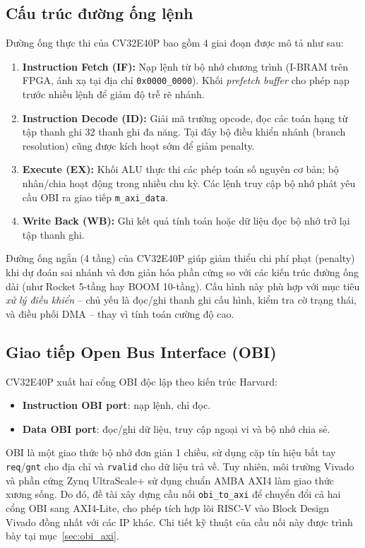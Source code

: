\subsection{Cấu trúc đường ống lệnh}
Đường ống thực thi của CV32E40P bao gồm 4 giai đoạn được mô tả như sau:
\begin{enumerate}
    \item \textbf{Instruction Fetch (IF):} Nạp lệnh từ bộ nhớ chương trình (I-BRAM trên FPGA, ánh xạ tại địa chỉ \texttt{0x0000\_0000}). Khối \textit{prefetch buffer} cho phép nạp trước nhiều lệnh để giảm độ trễ rẽ nhánh.
    \item \textbf{Instruction Decode (ID):} Giải mã trường opcode, đọc các toán hạng từ tập thanh ghi 32 thanh ghi đa năng. Tại đây bộ điều khiển nhánh (branch resolution) cũng được kích hoạt sớm để giảm penalty.
    \item \textbf{Execute (EX):} Khối ALU thực thi các phép toán số nguyên cơ bản; bộ nhân/chia hoạt động trong nhiều chu kỳ. Các lệnh truy cập bộ nhớ phát yêu cầu OBI ra giao tiếp \texttt{m\_axi\_data}.
    \item \textbf{Write Back (WB):} Ghi kết quả tính toán hoặc dữ liệu đọc bộ nhớ trở lại tập thanh ghi.
\end{enumerate}

Đường ống ngắn (4 tầng) của CV32E40P giúp giảm thiểu chi phí phạt (penalty) khi dự đoán sai nhánh và đơn giản hóa phần cứng so với các kiến trúc đường ống dài (như Rocket 5-tầng hay BOOM 10-tầng). Cấu hình này phù hợp với mục tiêu \textit{xử lý điều khiển} -- chủ yếu là đọc/ghi thanh ghi cấu hình, kiểm tra cờ trạng thái, và điều phối DMA -- thay vì tính toán cường độ cao.

\subsection{Giao tiếp Open Bus Interface (OBI)}
\label{sec:obi}
CV32E40P xuất hai cổng OBI độc lập theo kiến trúc Harvard:
\begin{itemize}
    \item \textbf{Instruction OBI port}: nạp lệnh, chỉ đọc.
    \item \textbf{Data OBI port}: đọc/ghi dữ liệu, truy cập ngoại vi và bộ nhớ chia sẻ.
\end{itemize}

OBI là một giao thức bộ nhớ đơn giản 1 chiều, sử dụng cặp tín hiệu bắt tay \texttt{req}/\texttt{gnt} cho địa chỉ và \texttt{rvalid} cho dữ liệu trả về. Tuy nhiên, môi trường Vivado và phần cứng Zynq UltraScale+ sử dụng chuẩn AMBA AXI4 làm giao thức xương sống. Do đó, đề tài xây dựng cầu nối \texttt{obi\_to\_axi} để chuyển đổi cả hai cổng OBI sang AXI4-Lite, cho phép tích hợp lõi RISC-V vào Block Design Vivado đồng nhất với các IP khác. Chi tiết kỹ thuật của cầu nối này được trình bày tại mục~\ref{sec:obi_axi}.


